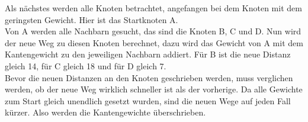 \documentclass[12pt]{article}
\begin{document}
		\begin{floatingfigure}[r]{0.5\textwidth}
		\end{floatingfigure}
	
		Als nächstes werden alle Knoten betrachtet, angefangen bei dem Knoten mit dem geringsten Gewicht. Hier ist das Startknoten A.\\
		Von A werden alle Nachbarn gesucht, das sind die Knoten B, C und D. Nun wird der neue Weg zu diesen Knoten berechnet, dazu wird das Gewicht von A mit dem Kantengewicht zu den jeweiligen Nachbarn addiert. Für B ist die neue Distanz gleich 14, für C gleich 18 und für D gleich 7.\\
		Bevor die neuen Distanzen an den Knoten geschrieben werden, muss verglichen werden, ob der neue Weg wirklich schneller ist als der vorherige. Da alle Gewichte zum Start gleich unendlich gesetzt wurden, sind die neuen Wege auf jeden Fall kürzer. Also werden die Kantengewichte überschrieben.\\
			
\end{document}

